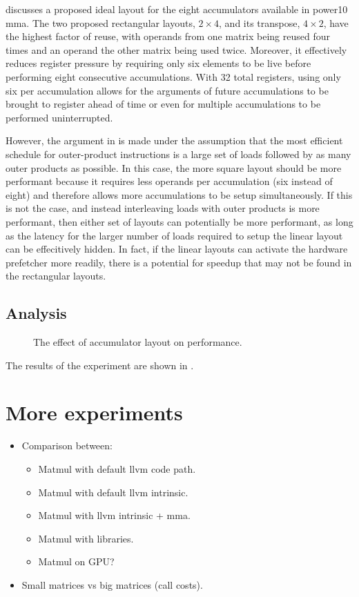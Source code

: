 \documentclass[\main/thesis.tex]{subfiles}
\begin{document}
 discusses a proposed ideal layout for the eight accumulators available in \gls{power10} \gls{mma}.
The two proposed rectangular layouts, $2 \times 4$, and its transpose, $4 \times 2$, have the highest factor of reuse, with operands from one matrix being reused four times and an operand the other matrix being used twice.
Moreover, it effectively reduces register pressure by requiring only six elements to be \gls{live} before performing eight consecutive accumulations.
With 32 total registers, using only six per accumulation allows for the arguments of future accumulations to be brought to register ahead of time or even for multiple accumulations to be performed uninterrupted.

However, the argument in  is made under the assumption that the most efficient schedule for outer-product instructions is a large set of loads followed by as many outer products as possible.
In this case, the more square layout should be more performant because it requires less operands per accumulation (six instead of eight) and therefore allows more accumulations to be setup simultaneously.
If this is not the case, and instead interleaving loads with outer products is more performant, then either set of layouts can potentially be more performant, as long as the latency for the larger number of loads required to setup the linear layout can be effecitively hidden.
In fact, if the linear layouts can activate the hardware prefetcher more readily, there is a potential for speedup that may not be found in the rectangular layouts.

\subsection{Analysis}
\begin{figure}[t]
  \centering
  
  \caption{The effect of accumulator layout on performance.}
  \label{fig:tightAccLayout}
\end{figure}

The results of the experiment are shown in .

\section{More experiments}
\begin{itemize}
  \item Comparison between:
  \begin{itemize}
    \item Matmul with default llvm code path.
    \item Matmul with default llvm intrinsic.
    \item Matmul with llvm intrinsic + mma.
    \item Matmul with libraries.
    \item Matmul on GPU?
  \end{itemize}
\end{itemize}

\begin{itemize}
  \item Small matrices vs big matrices (call costs).
\end{itemize}
\end{document}
